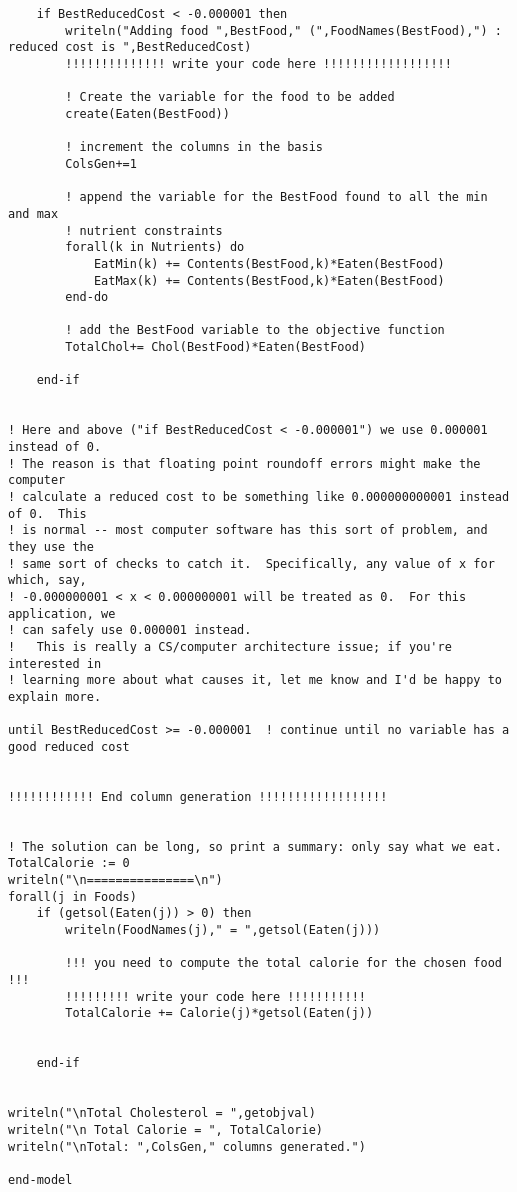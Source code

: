 \documentclass[twoside,12pt]{article}
\begin{document}
\begin{verbatim}
	if BestReducedCost < -0.000001 then		
		writeln("Adding food ",BestFood," (",FoodNames(BestFood),") : reduced cost is ",BestReducedCost)
		!!!!!!!!!!!!!! write your code here !!!!!!!!!!!!!!!!!!
		
		! Create the variable for the food to be added 
		create(Eaten(BestFood))	

		! increment the columns in the basis
		ColsGen+=1
		
		! append the variable for the BestFood found to all the min and max
		! nutrient constraints
		forall(k in Nutrients) do
			EatMin(k) += Contents(BestFood,k)*Eaten(BestFood)
			EatMax(k) += Contents(BestFood,k)*Eaten(BestFood)
		end-do

		! add the BestFood variable to the objective function 
		TotalChol+= Chol(BestFood)*Eaten(BestFood)
		
	end-if


! Here and above ("if BestReducedCost < -0.000001") we use 0.000001 instead of 0.
! The reason is that floating point roundoff errors might make the computer
! calculate a reduced cost to be something like 0.000000000001 instead of 0.  This
! is normal -- most computer software has this sort of problem, and they use the
! same sort of checks to catch it.  Specifically, any value of x for which, say,
! -0.000000001 < x < 0.000000001 will be treated as 0.  For this application, we
! can safely use 0.000001 instead.
!   This is really a CS/computer architecture issue; if you're interested in
! learning more about what causes it, let me know and I'd be happy to explain more.

until BestReducedCost >= -0.000001	! continue until no variable has a good reduced cost


!!!!!!!!!!!! End column generation !!!!!!!!!!!!!!!!!!

		
! The solution can be long, so print a summary: only say what we eat.
TotalCalorie := 0
writeln("\n===============\n")
forall(j in Foods)
	if (getsol(Eaten(j)) > 0) then
		writeln(FoodNames(j)," = ",getsol(Eaten(j)))
		
		!!! you need to compute the total calorie for the chosen food !!!
		!!!!!!!!! write your code here !!!!!!!!!!!
		TotalCalorie += Calorie(j)*getsol(Eaten(j))
		
		
	end-if
	

writeln("\nTotal Cholesterol = ",getobjval)
writeln("\n Total Calorie = ", TotalCalorie)
writeln("\nTotal: ",ColsGen," columns generated.")

end-model
\end{verbatim}
\end{document}

